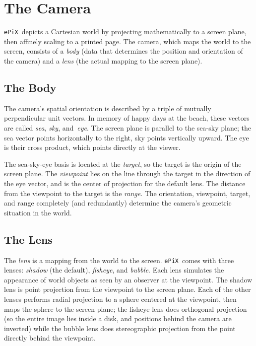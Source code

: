 \documentclass[12pt]{report}
\newcommand{\code}[1]{\texttt{#1}}
\newcommand{\ePiX}{\code{ePiX}}
\begin{document}
\section{The Camera}

\ePiX\ depicts a Cartesian world by projecting mathematically to a
screen plane, then affinely scaling to a printed page. The camera,
which maps the world to the screen, consists of a \emph{body} (data
that determines the position and orientation of the camera) and a
\emph{lens} (the actual mapping to the screen plane).


\subsection*{The Body}

The camera's spatial orientation is described by a triple of mutually
perpendicular unit vectors.  In memory of happy days at the beach,
these vectors are called \emph{sea}, \emph{sky}, and~\emph{eye}. The
screen plane is parallel to the sea-sky plane; the sea vector points
horizontally to the right, sky points vertically upward. The eye is
their cross product, which points directly at the viewer.

The sea-sky-eye basis is located at the \emph{target}, so the target
is the origin of the screen plane. The \emph{viewpoint} lies on the
line through the target in the direction of the eye vector, and is the
center of projection for the default lens.  The distance from the
viewpoint to the target is the \emph{range}.  The orientation,
viewpoint, target, and range completely (and redundantly) determine
the camera's geometric situation in the world.


\subsection*{The Lens}

The \emph{lens} is a mapping from the world to the screen.  \ePiX\ 
comes with three lenses: \emph{shadow} (the default), \emph{fisheye},
and \emph{bubble}. Each lens simulates the appearance of world objects
as seen by an observer at the viewpoint. The shadow lens is point
projection from the viewpoint to the screen plane.  Each of the other
lenses performs radial projection to a sphere centered at the
viewpoint, then maps the sphere to the screen plane; the fisheye lens
does orthogonal projection (so the entire image lies inside a disk,
and positions behind the camera are inverted) while the bubble lens
does stereographic projection from the point directly behind the
viewpoint.
\end{document}
